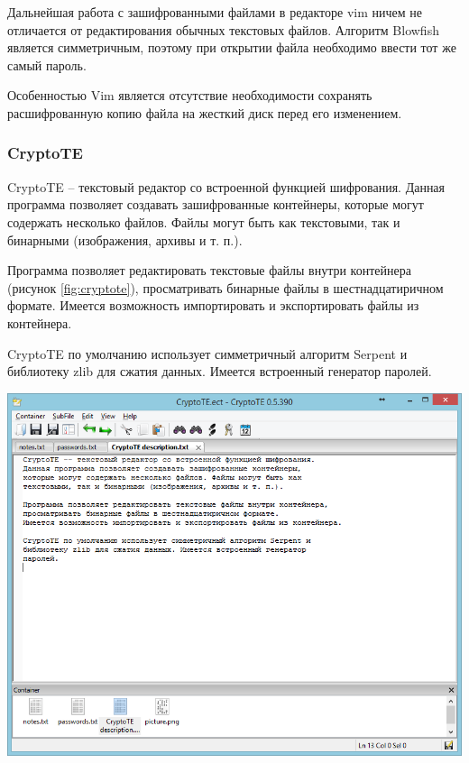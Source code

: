 Дальнейшая работа с зашифрованными файлами в редакторе vim ничем
не отличается от редактирования обычных текстовых файлов. Алгоритм
Blowfish является симметричным, поэтому при открытии файла необходимо
ввести тот же самый пароль.

Особенностью Vim является отсутствие необходимости сохранять
расшифрованную копию файла на жесткий диск перед его изменением.

\newpage
\subsubsection{CryptoTE}


CryptoTE -- текстовый редактор со встроенной функцией шифрования.
Данная программа позволяет создавать зашифрованные контейнеры,
которые могут содержать несколько файлов. Файлы могут быть как
текстовыми, так и бинарными (изображения, архивы и т. п.).

Программа позволяет редактировать текстовые файлы внутри контейнера
(рисунок \ref{fig:cryptote}), просматривать бинарные файлы
в шестнадцатиричном формате. Имеется возможность импортировать
и экспортировать файлы из контейнера.

CryptoTE по умолчанию использует симметричный алгоритм Serpent и
библиотеку zlib для сжатия данных. Имеется встроенный генератор
паролей.

\noindent
\begin{minipage}{\textwidth}
  \vspace{3.5mm}
  \centering
  \includegraphics[scale=0.6]{./pics/cryptote-main.png}
  \label{fig:cryptote}
  \vspace{3.5mm}
\end{minipage}

